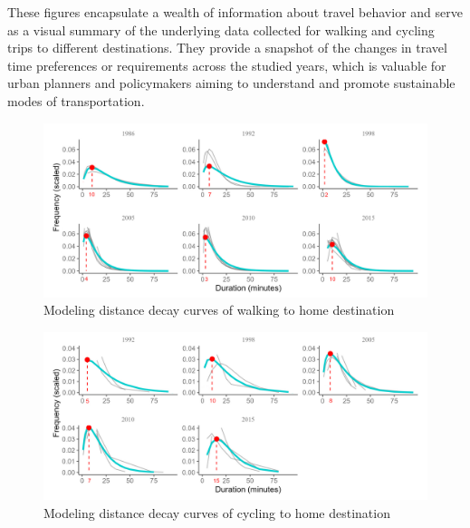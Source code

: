 \documentclass[12pt,twoside]{reedthesis}
\begin{document}
These figures encapsulate a wealth of information about travel behavior and serve as a visual summary of the underlying data collected for walking and cycling trips to different destinations. They provide a snapshot of the changes in travel time preferences or requirements across the studied years, which is valuable for urban planners and policymakers aiming to understand and promote sustainable modes of transportation.

\newpage
\begin{landscape}
\centering
\begin{figure}
\includegraphics[width=1.1\linewidth]{home-wi} \caption{Modeling distance decay curves of walking to home destination}\label{fig:home-wi}
\end{figure}
\end{landscape}
\clearpage

\newpage
\begin{landscape}
\centering
\begin{figure}
\includegraphics[width=1.1\linewidth]{home-ci} \caption{Modeling distance decay curves of cycling to home destination}\label{fig:home-ci}
\end{figure}
\end{landscape}
\clearpage
\end{document}

